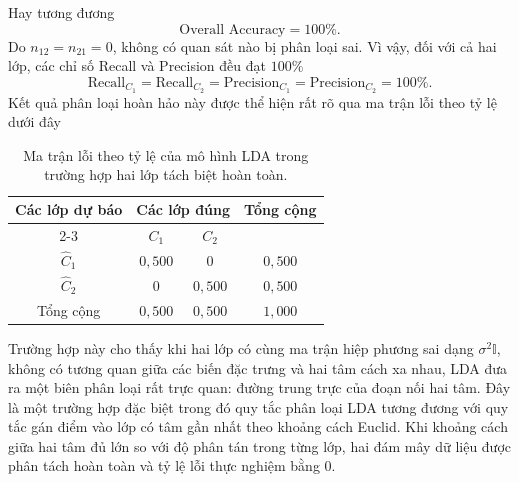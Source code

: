 Hay tương đương
\[
\text{Overall Accuracy}=100\%.
\]
Do $n_{12}=n_{21}=0$, không có quan sát nào bị phân loại sai. Vì vậy, đối với cả hai lớp, các chỉ số Recall và Precision đều đạt $100\%$
\[
\text{Recall}_{C_1}
=
\text{Recall}_{C_2}
=
\text{Precision}_{C_1}
=
\text{Precision}_{C_2}
=
100\%.
\]
Kết quả phân loại hoàn hảo này được thể hiện rất rõ qua ma trận lỗi theo tỷ lệ dưới đây
\begin{table}[H]
	\centering
	\begin{tabular}{|c|cc|c|}
		\hline
		\multirow{2}{*}{Các lớp dự báo} 
		& \multicolumn{2}{c|}{Các lớp đúng} 
		& \multirow{2}{*}{Tổng cộng} \\ \cline{2-3}
		& $C_1$ & $C_2$ & \\ \hline
		$\hat{C}_1$ & $0{,}500$ & $0$ & $0{,}500$ \\
		$\hat{C}_2$ & $0$ & $0{,}500$ & $0{,}500$ \\ \hline
		Tổng cộng & $0{,}500$ & $0{,}500$  & $1{,}000$ \\ \hline
	\end{tabular}
	\caption{Ma trận lỗi theo tỷ lệ của mô hình LDA trong trường hợp hai lớp tách biệt hoàn toàn.}
	\label{tab:MaTranLoiTyLe_LDA_TachBietHoanToan}
\end{table}
Trường hợp này cho thấy khi hai lớp có cùng ma trận hiệp phương sai dạng $\sigma^2 \mathbb{I}$, không có tương quan giữa các biến đặc trưng và hai tâm cách xa nhau, LDA đưa ra một biên phân loại rất trực quan: đường trung trực của đoạn nối hai tâm. Đây là một trường hợp đặc biệt trong đó quy tắc phân loại LDA tương đương với quy tắc gán điểm vào lớp có tâm gần nhất theo khoảng cách Euclid. Khi khoảng cách giữa hai tâm đủ lớn so với độ phân tán trong từng lớp, hai đám mây dữ liệu được phân tách hoàn toàn và tỷ lệ lỗi thực nghiệm bằng $0$.